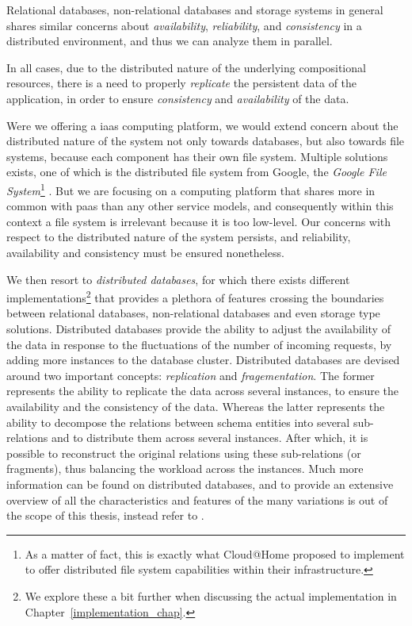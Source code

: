 \documentclass[12pt, titlepage]{uo_temp}
\begin{document}
     Relational databases, non-relational databases and storage systems in general shares
     similar concerns about \emph{availability}, \emph{reliability}, and
     \emph{consistency} in a distributed environment, and thus we can analyze them in
     parallel.

     In all cases, due to the distributed nature of the underlying compositional
     resources, there is a need to properly \emph{replicate} the persistent data of the
     application, in order to ensure \emph{consistency} and \emph{availability} of the
     data.

     Were we offering a \gls{iaas} computing platform, we would extend concern about the
     distributed nature of the system not only towards databases, but also towards file
     systems, because each component has their own file system. Multiple solutions
     exists, one of which is the distributed file system from Google, the \emph{Google
       File System}\footnote{As a matter of fact, this is exactly what Cloud@Home proposed
       to implement to offer distributed file system capabilities within their
       infrastructure.} \cite{gfs}. But we are focusing on a computing platform that
     shares more in common with \gls{paas} than any other service models, and consequently
     within this context a file system is irrelevant because it is too low-level. Our
     concerns with respect to the distributed nature of the system persists, and
     reliability, availability and consistency must be ensured nonetheless.

     We then resort to \emph{distributed databases}, for which there exists different
     implementations\footnote{We explore these a bit further when discussing the actual
       implementation in Chapter~\ref{implementation_chap}.} that provides a plethora of
     features crossing the boundaries between relational databases,
     non-relational databases and even storage type solutions. Distributed databases
     provide the ability to adjust the availability of the data in response to the
     fluctuations of the number of incoming requests, by adding more instances to the
     database cluster. Distributed databases are devised around two important concepts:
     \emph{replication} and \emph{fragementation}. The former represents the ability to
     replicate the data across several instances, to ensure the availability and the
     consistency of the data. Whereas the latter represents the ability to decompose the
     relations between schema entities into several sub-relations and to distribute them
     across several instances. After which, it is possible to reconstruct the original
     relations using these sub-relations (or fragments), thus balancing the workload
     across the instances. Much more information can be found on distributed databases,
     and to provide an extensive overview of all the characteristics and features of the
     many variations is out of the scope of this thesis, instead refer to
     \cite{linders1976distributed} \cite{draffan1980distributed}
     \cite{ozsu2011principles}.
\end{document}
